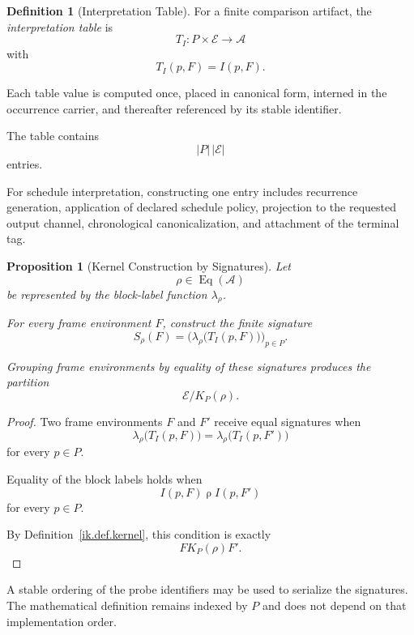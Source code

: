 \documentclass[11pt]{article}
\theoremstyle{plain}
\newtheorem{proposition}[theorem]{Proposition}
\theoremstyle{definition}
\newtheorem{definition}[theorem]{Definition}
\theoremstyle{remark}
\begin{document}
\begin{definition}[Interpretation Table]
  \label{ik.def.interpretation-table}
  For a finite comparison artifact,
  the \emph{interpretation table} is
  \[
    T_I:
    P\times\mathcal{E}
    \longrightarrow
    \mathcal{A}
  \]
  with
  \[
    T_I(p,F)
    =
    I(p,F).
  \]

  Each table value is computed once,
  placed in canonical form,
  interned in the occurrence carrier,
  and thereafter referenced by its stable identifier.
\end{definition}

The table contains
\[
  |P|\,|\mathcal{E}|
\]
entries.

For schedule interpretation,
constructing one entry includes recurrence generation,
application of declared schedule policy,
projection to the requested output channel,
chronological canonicalization,
and attachment of the terminal tag.

\begin{proposition}[Kernel Construction by Signatures]
  \label{ik.prop.kernel-construction}
  Let
  \[
    \rho
    \in
    \operatorname{Eq}(\mathcal{A})
  \]
  be represented by the block-label function
  \(\lambda_{\rho}\).

  For every frame environment \(F\),
  construct the finite signature
  \[
    S_{\rho}(F)
    =
    \bigl(
    \lambda_{\rho}
    \bigl(
    T_I(p,F)
    \bigr)
    \bigr)_{p\in P}.
  \]

  Grouping frame environments
  by equality of these signatures
  produces the partition
  \[
    \mathcal{E}/K_P(\rho).
  \]
\end{proposition}

\begin{proof}
  Two frame environments \(F\) and \(F'\)
  receive equal signatures when
  \[
    \lambda_{\rho}
    \bigl(
    T_I(p,F)
    \bigr)
    =
    \lambda_{\rho}
    \bigl(
    T_I(p,F')
    \bigr)
  \]
  for every \(p\in P\).

  Equality of the block labels holds when
  \[
    I(p,F)
    \mathrel{\rho}
    I(p,F')
  \]
  for every \(p\in P\).

  By Definition~\ref{ik.def.kernel},
  this condition is exactly
  \[
    F\mathrel{K_P(\rho)}F'.
  \]
\end{proof}

A stable ordering of the probe identifiers
may be used to serialize the signatures.
The mathematical definition remains indexed by \(P\)
and does not depend on that implementation order.
\end{document}
